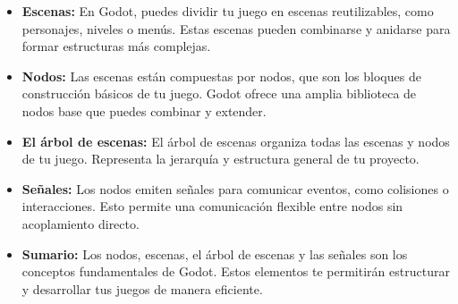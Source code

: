 \documentclass[12pt]{report} %
\begin{document}
\begin{itemize}
    \item \textbf{Escenas:} En Godot, puedes dividir tu juego en escenas reutilizables, como personajes, niveles o menús. Estas escenas pueden combinarse y anidarse para formar estructuras más complejas.

    \item \textbf{Nodos:} Las escenas están compuestas por nodos, que son los bloques de construcción básicos de tu juego. Godot ofrece una amplia biblioteca de nodos base que puedes combinar y extender.

    \item \textbf{El árbol de escenas:} El árbol de escenas organiza todas las escenas y nodos de tu juego. Representa la jerarquía y estructura general de tu proyecto.

    \item \textbf{Señales:} Los nodos emiten señales para comunicar eventos, como colisiones o interacciones. Esto permite una comunicación flexible entre nodos sin acoplamiento directo.

    \item \textbf{Sumario:} Los nodos, escenas, el árbol de escenas y las señales son los conceptos fundamentales de Godot. Estos elementos te permitirán estructurar y desarrollar tus juegos de manera eficiente.
\end{itemize}


\end{document}
